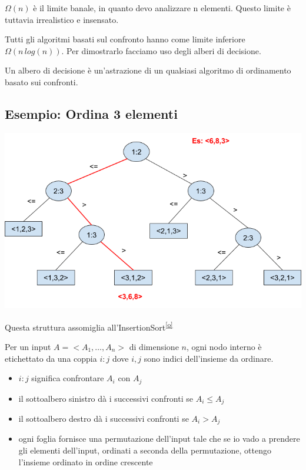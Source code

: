 \documentclass{article}
\providecommand{\tightlist}{%
  \setlength{\itemsep}{0pt}\setlength{\parskip}{0pt}}
\begin{document}
{$\Omega(n)$ è il limite banale, in quanto devo analizzare n elementi. Questo limite è tuttavia irrealistico e insensato.}

{Tutti gli algoritmi basati sul confronto hanno come limite inferiore $\Omega(n\,log(n))$. Per dimostrarlo facciamo uso degli alberi di decisione.}

{Un albero di decisione è un'astrazione di un qualsiasi algoritmo di ordinamento basato sui confronti.}

\subsection{Esempio: Ordina 3 elementi}

{\includegraphics{images/image531.png}}

{Questa struttura assomiglia all'InsertionSort}\textsuperscript{\protect\hyperlink{cmnt15}{{[}o{]}}}

{Per un input $A = <A_1,\ldots,A_n>$ di dimensione $n$, ogni nodo interno è etichettato da una coppia $i:j$ dove $i,j$ sono indici dell'insieme da ordinare.}

\begin{itemize}
\tightlist
\item
  {$i:j$ significa confrontare $A_i$ con $A_j$}
\item
  {il sottoalbero sinistro dà i successivi confronti se $A_i \leq A_j$}
\item
  {il sottoalbero destro dà i successivi confronti se $A_i > A_j$}
\item
  {ogni foglia fornisce una permutazione dell'input tale che se io vado a prendere gli elementi dell'input, ordinati a seconda della permutazione, ottengo l'insieme ordinato in ordine crescente}
\end{itemize}
\end{document}
